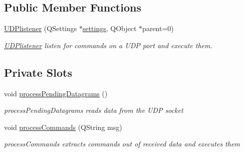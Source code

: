 \subsection*{Public Member Functions}
\begin{DoxyCompactItemize}
\item 
\hyperlink{classUDPlistener_a789cb6a7b7347a2df5cdc85a457bde4a}{U\+D\+Plistener} (Q\+Settings $\ast$\hyperlink{classUDPlistener_a14614017bcc3fc38e0caad8d4a9781a6}{settings}, Q\+Object $\ast$parent=0)
\begin{DoxyCompactList}\small\item\em \hyperlink{classUDPlistener}{U\+D\+Plistener} listen for commands on a U\+DP port and execute them. \end{DoxyCompactList}\end{DoxyCompactItemize}
\subsection*{Private Slots}
\begin{DoxyCompactItemize}
\item 
\mbox{\label{classUDPlistener_ac971ee184440cfc88ff260db8ca3a2ca}} 
void \hyperlink{classUDPlistener_ac971ee184440cfc88ff260db8ca3a2ca}{process\+Pending\+Datagrams} ()
\begin{DoxyCompactList}\small\item\em process\+Pending\+Datagrams reads data from the U\+DP socket \end{DoxyCompactList}\item 
void \hyperlink{classUDPlistener_a86e1147a1adf1a32ae49d43529cd53f1}{process\+Commands} (Q\+String msg)
\begin{DoxyCompactList}\small\item\em process\+Commands extracts commands out of received data and executes them \end{DoxyCompactList}\end{DoxyCompactItemize}
